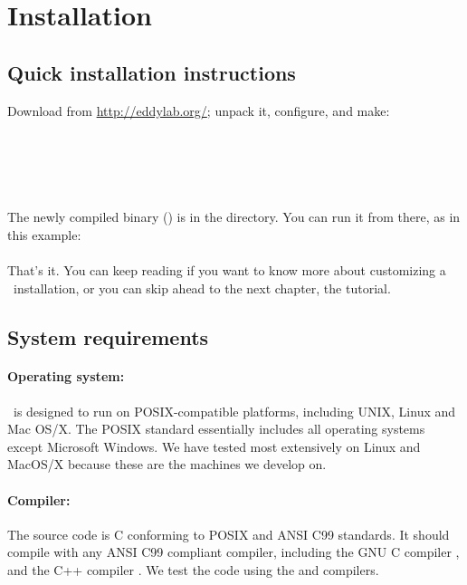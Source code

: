 \section{Installation}
\label{section:installation}
\setcounter{footnote}{0}

\subsection{Quick installation instructions}

Download  from \url{http://eddylab.org/}; unpack
it, configure, and make:\\

\\
\\
\\ 
\\
\\

The newly compiled binary (\prog{\etwomsa}) is in the
 directory. You can run it from there,
as in this example:\\

\\


That's it.  You can keep reading if you want to know more about
customizing a \etwomsa\ installation, or you can skip ahead to the next
chapter, the tutorial.


\subsection{System requirements}

\paragraph{Operating system:} \etwomsa\ is designed to run on
POSIX-compatible platforms, including UNIX, Linux and Mac OS/X. The
POSIX standard essentially includes all operating systems except
Microsoft Windows. We have tested most extensively on Linux and
MacOS/X because these are the machines we develop on.

\paragraph{Compiler:} The source code is C conforming to POSIX and ANSI
C99 standards. It should compile with any ANSI C99 compliant compiler,
including the GNU C compiler , and the C++ compiler
. We test the code using the  and 
compilers.

